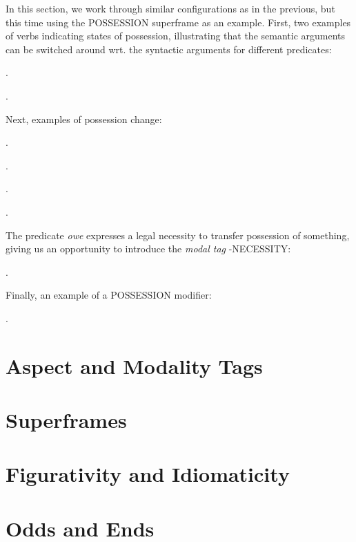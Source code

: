 \documentclass[a4paper]{article}
\newcommand{\fr}[1]{\textsf{#1}}
\begin{document}
In this section, we work through similar configurations as in the previous, but this time using the \fr{POSSESSION} superframe as an example. First, two examples of verbs indicating states of possession, illustrating that the semantic arguments can be switched around wrt. the syntactic arguments for different predicates:

\ex.

\ex.

Next, examples of possession change:

\ex.

\ex.

\ex.

\ex.

The predicate \emph{owe} expresses a legal necessity to transfer possession of something, giving us an opportunity to introduce the \emph{modal tag} \fr{-NECESSITY}:

\ex.

Finally, an example of a \fr{POSSESSION} modifier:

\ex.

\section{Aspect and Modality Tags}

\section{Superframes}

\section{Figurativity and Idiomaticity}

\section{Odds and Ends}



\end{document}
